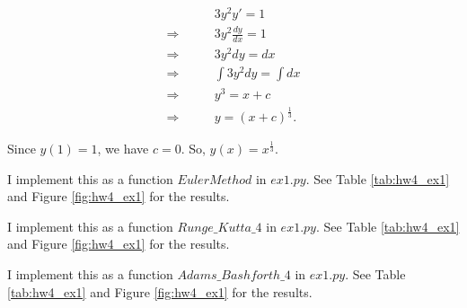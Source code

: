 \documentclass[
  course = {{16-811 Math Fundamentals for Robotics}},
  quartile = {{1}},
  assignment = 4,
  name = {{Kangle Deng}},
  email = {{kangled@andrew.cmu.edu}},
  firstexercise = 1
]{aga-homework}
\begin{document}
\exercise
\subexercise

\begin{equation*}
\begin{aligned}
& 3y^2y' = 1 \\
\Rightarrow \qquad & 3y^2\frac{dy}{dx} = 1\\
\Rightarrow \qquad & 3y^2 dy = dx \\
\Rightarrow \qquad & \int 3y^2 dy = \int dx \\
\Rightarrow \qquad & y^3 = x + c \\ 
\Rightarrow \qquad & y = (x + c)^\frac{1}{3}.
\end{aligned}
\end{equation*}

Since $y(1) = 1$, we have $c = 0$. So, $y(x) = x^\frac{1}{3}$.

\subexercise

I implement this as a function $EulerMethod$ in $ex1.py$. See Table \ref{tab:hw4_ex1} and Figure \ref{fig:hw4_ex1} for the results.

\subexercise

I implement this as a function $Runge\_Kutta\_4$ in $ex1.py$. See Table \ref{tab:hw4_ex1} and Figure \ref{fig:hw4_ex1} for the results.

\subexercise

I implement this as a function $Adams\_Bashforth\_4$ in $ex1.py$. See Table \ref{tab:hw4_ex1} and Figure \ref{fig:hw4_ex1} for the results.
\end{document}
